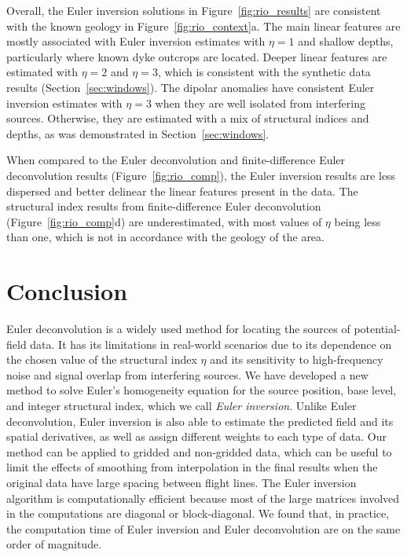 Overall, the Euler inversion solutions in Figure~\ref{fig:rio_results} are
consistent with the known geology in Figure~\ref{fig:rio_context}a.
The main linear features are mostly associated with Euler inversion estimates
with $\eta=1$ and shallow depths, particularly where known dyke outcrops are
located.
Deeper linear features are estimated with $\eta=2$ and $\eta=3$, which is
consistent with the synthetic data results (Section~\ref{sec:windows}).
The dipolar anomalies have consistent Euler inversion estimates with $\eta=3$
when they are well isolated from interfering sources.
Otherwise, they are estimated with a mix of structural indices and depths, as
was demonstrated in Section~\ref{sec:windows}.

When compared to the Euler deconvolution and finite-difference Euler
deconvolution results (Figure~\ref{fig:rio_comp}), the Euler inversion results
are less dispersed and better delinear the linear features present in the data.
The structural index results from finite-difference Euler deconvolution
(Figure~\ref{fig:rio_comp}d) are underestimated, with most values of $\eta$
being less than one, which is not in accordance with the geology of the area.

\section{Conclusion}

Euler deconvolution is a widely used method for locating the sources of
potential-field data.
It has its limitations in real-world scenarios due to its dependence on the
chosen value of the structural index $\eta$ and its sensitivity to
high-frequency noise and signal overlap from interfering sources.
We have developed a new method to solve Euler's homogeneity equation for the
source position, base level, and integer structural index, which we call
\textit{Euler inversion}.
Unlike Euler deconvolution, Euler inversion is also able to estimate the
predicted field and its spatial derivatives, as well as assign different
weights to each type of data.
Our method can be applied to gridded and non-gridded data, which can
be useful to limit the effects of smoothing from interpolation in the final
results when the original data have large spacing between flight lines.
The Euler inversion algorithm is computationally efficient because most of the
large matrices involved in the computations are diagonal or block-diagonal.
We found that, in practice, the computation time of Euler inversion and Euler
deconvolution are on the same order of magnitude.

